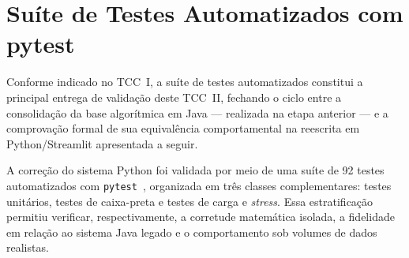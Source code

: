 \section{Suíte de Testes Automatizados com pytest}

Conforme indicado no TCC~I, a suíte de testes automatizados constitui a principal
entrega de validação deste TCC~II, fechando o ciclo entre a consolidação da base
algorítmica em Java --- realizada na etapa anterior --- e a comprovação formal de
sua equivalência comportamental na reescrita em Python/Streamlit apresentada a
seguir.

A correção do sistema Python foi validada por meio de uma suíte de 92 testes
automatizados com \texttt{pytest}~\cite{pytest2024}, organizada em três classes
complementares: testes unitários, testes de caixa-preta e testes de carga e
\textit{stress}. Essa estratificação permitiu verificar, respectivamente, a
corretude matemática isolada, a fidelidade em relação ao sistema Java legado e
o comportamento sob volumes de dados realistas.

